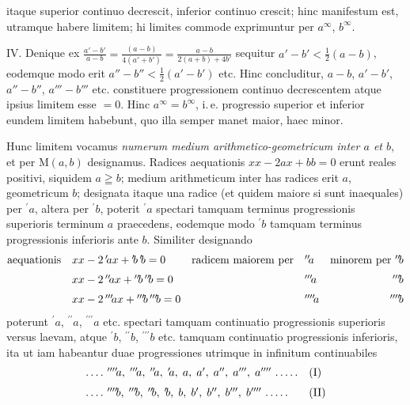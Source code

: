 itaque superior continuo decrescit, inferior continuo crescit; hinc manifestum est,
utramque habere limitem; hi limites commode exprimuntur per $a^{\infty}$, $b^{\infty}$.
\par
IV. Denique ex $\frac{a'-b'}{a-b}=\frac{(a-b)}{4(a'+b')}=\frac{a-b}{2(a+b)+4b'}$ sequitur $a'-b'<\tfrac12(a-b)$,
eodemque modo erit $a''-b''<\tfrac12(a'-b')$ etc. Hinc concluditur, $a-b$, $a'-b'$,
$a''-b''$, $a'''-b'''$ etc. constituere progressionem continuo decrescentem atque ipsius
limitem esse $=0$. Hinc $a^{\infty}=b^{\infty}$, i.\,e. progressio superior et inferior eundem
limitem habebunt, quo illa semper manet maior, haec minor.
\par
Hunc limitem vocamus \textit{numerum medium arithmetico-geometricum inter $a$ et $b$},
et per $\mathrm{M}(a,b)$ designamus.
Radices aequationis $xx-2ax+bb=0$ erunt reales positivi, siquidem
$a\geqq b$; medium arithmeticum inter has radices erit $a$, geometricum $b$; designata
itaque una radice (et quidem maiore si sunt inaequales) per ${}^{\prime}\!a$, altera per ${}^{\prime}\!b$, poterit ${}^{\prime}\!a$ spectari tamquam terminus progressionis superioris terminum $a$ praecedens, eodemque modo ${}^{\prime}\!b$ tamquam terminus progressionis inferioris ante $b$. Similiter designando
\begingroup\setlength{\arraycolsep}{2pt}
\[
\begin{array}{@{}lllll@{}}
\mathrm{aequationis}&xx-2\,{}^{\prime}\!ax+{}^{\prime}\!b\,{}^{\prime}\!b=0&\mathrm{radicem\ maiorem\ per}&{}^{\prime\prime}\!a&\mathrm{minorem\ per}\ {}^{\prime\prime}\!b\\[6pt]
&xx-2\,{}^{\prime\prime}\!ax+{}^{\prime\prime}\!b\,{}^{\prime\prime}\!b=0&&{}^{\prime\prime\prime}\!a&\hfill{}^{\prime\prime\prime}\!b\\[6pt]
&xx-2\,{}^{\prime\prime\prime}\!ax+{}^{\prime\prime\prime}\!b\,{}^{\prime\prime\prime}\!b=0&&{}^{\prime\prime\prime\prime}\!a&\hfill{}^{\prime\prime\prime\prime}\!b
\end{array}
\]\endgroup
poterunt ${}^{\prime}\!a$, ${}^{\prime\prime}\!a$, ${}^{\prime\prime\prime}\!a$ etc. spectari tamquam continuatio progressionis superioris versus laevam, atque ${}^{\prime}\!b$, ${}^{\prime\prime}\!b$, ${}^{\prime\prime\prime}\!b$ etc. tamquam continuatio progressionis inferioris, ita
ut iam habeantur duae progressiones utrimque in infinitum continuabiles
\[
\begin{array}{@{}ll@{}}
.\,.\,.\,.\ {}^{\prime\prime\prime\prime}\!a,\;{}^{\prime\prime\prime}\!a,\;{}^{\prime\prime}\!a,\;{}^{\prime}\!a,\; a,\; a',\; a'',\; a''',\; a''''\ .\,.\,.\,.\,.&\mathrm{(I)}\\[6pt]
.\,.\,.\,.\ {}^{\prime\prime\prime\prime}\!b,\;{}^{\prime\prime\prime}\!b,\;{}^{\prime\prime}\!b,\;{}^{\prime}\!b,\; b,\; b',\; b'',\; b''',\; b''''\ .\,.\,.\,.\,.&\mathrm{(II)}
\end{array}
\]
